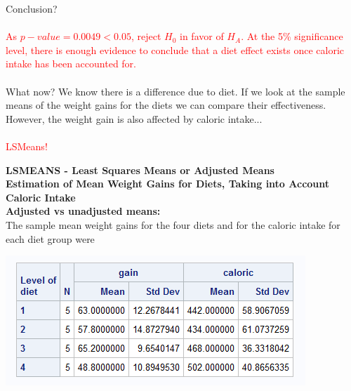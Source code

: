 Conclusion?%
\textcolor{red}{\\~\\
As $p-value=0.0049<0.05$, reject $H_0$ in favor of $H_A$.  At the 5\% significance level, there is enough evidence to conclude that a diet effect exists once caloric intake has been accounted for.}\\~\\

What now?  We know there is a difference due to diet.  If we look at the sample means of the weight gains for the diets we can compare their effectiveness.  However, the weight gain is also affected by caloric intake...\\~\\
\textcolor{red}{LSMeans!}

\newpage

\Large\textbf{LSMEANS - Least Squares Means or Adjusted Means}\large\\
\textbf{Estimation of Mean Weight Gains for Diets, Taking into Account Caloric Intake}\\

\textbf{Adjusted vs unadjusted means:}\\
The sample mean weight gains for the four diets and for the caloric intake for each diet group were
\begin{center}
\includegraphics{DietsMeans}
\end{center}

